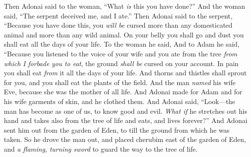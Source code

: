 \begin{biblechapter}
\verse Then Adonai said to the woman, “What \textit{is} this you have done?” And the woman said, “The serpent deceived me, and I ate.”
\verse Then Adonai said to the serpent,
\verse “Because you have done this, 
you \textit{will be} cursed 
more than any domesticated animal 
and more than any wild animal. 
On your belly you shall go 
and dust you shall eat 
all the days of your life.
\verse To the woman he said,
\verse And to Adam he said, “Because you listened to the voice of your wife and you ate from the tree \textit{from which I forbade you to eat},
\verse the ground \textit{shall be} cursed on your account. 
In pain you shall eat \textit{from} it 
all the days of your life.
\verse And thorns and thistles shall sprout for you, 
and you shall eat the plants of the field.
\verse And the man \textit{named} his wife Eve, because she was the mother of all life.
\verse And Adonai made for Adam and for his wife garments of skin, and he clothed them.
\verse And Adonai said, “Look—the man has become as one of us, to know good and evil. \textit{What if} he stretches out his hand and takes also from the tree of life and eats, and lives forever?”
\verse And Adonai sent him out from the garden of Eden, to till the ground from which he was taken.
\verse So he drove the man out, and placed cherubim east of the garden of Eden, and \textit{a flaming, turning sword} to guard the way to the tree of life.
\end{biblechapter}


